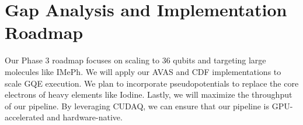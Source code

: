 \documentclass[11pt]{article}
\begin{document}
\section{Gap Analysis and Implementation Roadmap}
Our Phase 3 roadmap focuses on scaling to 36 qubits and targeting large molecules like IMePh. We will apply our AVAS and CDF implementations to scale GQE execution. We plan to incorporate pseudopotentials to replace the core electrons of heavy elements like Iodine. Lastly, we will maximize the throughput of our pipeline. By leveraging CUDAQ, we can ensure that our pipeline is GPU-accelerated and hardware-native.

\newpage


\end{document}
